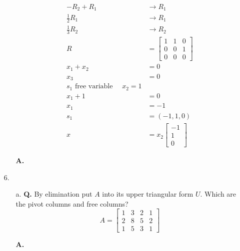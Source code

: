 \documentclass[main.tex]{subfiles}
\begin{document}
\begin{enumerate}
\begin{enumerate}
$$\begin{aligned}
    -R_2 + R_1 &\rightarrow R_1\\
    \frac{1}{2}R_1 &\rightarrow R_1\\
    \frac{1}{3}R_2 &\rightarrow R_2\\
    R & = \left[\begin{array}{lll}
    1 & 1 & 0 \\
    0 & 0 & 1 \\
    0 & 0 & 0
    \end{array}\right]\\
    x_1+x_2 & = 0\\
    x_3 & = 0\\
    s_1 \text{ free variable } \quad x_2 = 1 \\
    x_1 + 1 & = 0 \\
    x_1 &= -1 \\
    s_1 & = (-1,1,0) \\
    x&=x_2\left[\begin{array}{c}
    -1\\
    1\\
    0
    \end{array}\right]
    \end{aligned}
    $$
    
    \textbf{A.}
    
\end{enumerate}

\item[6.] 
    \begin{enumerate}
    \item [a.] \textbf{Q.} By elimination put $A$ into its upper triangular form $U$. Which are the pivot columns and free columns?
    $$
    A=\left[\begin{array}{llll}
    1 & 3 & 2 & 1 \\
    2 & 8 & 5 & 2 \\
    1 & 5 & 3 & 1
    \end{array}\right]
    $$
    
    \textbf{A.}
    

\end{enumerate}
\end{enumerate}
\end{document}
